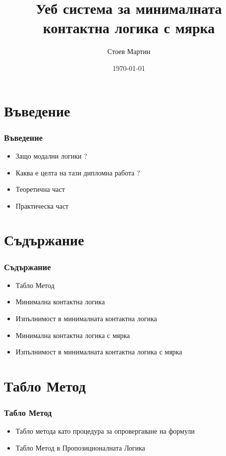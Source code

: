 \documentclass{beamer}
\begin{document}
\title{Уеб система за минималната контактна логика с мярка}  
\author{Стоев Мартин}
\date{\today} 
\begin{frame}
\titlepage
\end{frame}



\section{Въведение} 
\begin{frame}\frametitle{Въведение}
\begin{itemize}
	\item Защо модални логики ?
	\item Каква е целта на тази дипломна работа ?
	\item Теоретична част
	\item Практическа част
\end{itemize}
\end{frame}

\section{Съдържание} 
\begin{frame}\frametitle{Съдържание}
\begin{itemize}
	\item Табло Метод
	\item Минимална контактна логика
	\item Изпълнимост в минималната контактна логика
	\item Минимална контактна логика с мярка
	\item Изпълнимост в минималната контактна логика с мярка
\end{itemize}
\end{frame}

\section{Табло Метод}
\begin{frame}\frametitle{Табло Метод}
\begin{itemize}
	\item Табло метода като процедура за опровергаване на формули
	\item Табло Метод в Пропозиционалната Логика
\end{itemize}
\end{frame}
\end{document}
